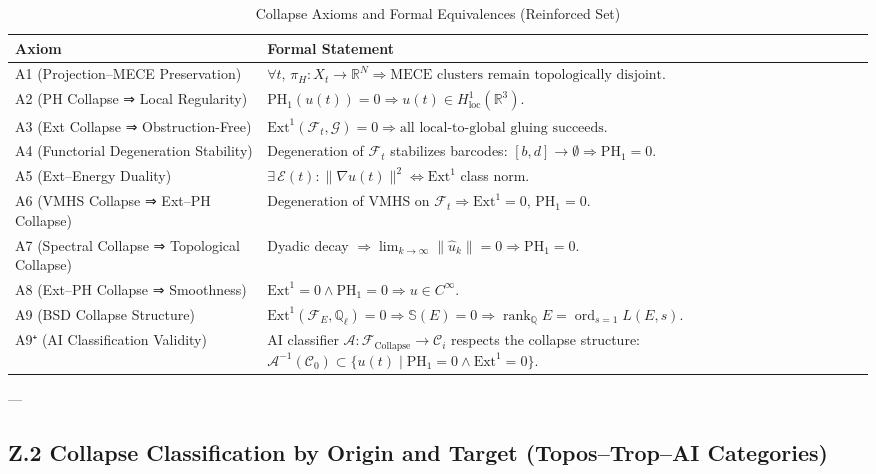\documentclass[11pt]{article}
\newcommand{\Sha}{\mathbb{S}}
\begin{document}
\begin{axiom}
\begin{axiom}
{{\begin{table}[H]
\centering
\renewcommand{\arraystretch}{1.4}
\begin{tabularx}{\textwidth}{lX}
\toprule
\textbf{Axiom} & \textbf{Formal Statement} \\
\midrule
A1 (Projection–MECE Preservation) & 
\( \forall t,\, \pi_H: X_t \to \mathbb{R}^N \Rightarrow \text{MECE clusters remain topologically disjoint}. \) \\
A2 (PH Collapse ⇒ Local Regularity) & 
\( \mathrm{PH}_1(u(t)) = 0 \Rightarrow u(t) \in H^1_{\text{loc}}(\mathbb{R}^3). \) \\
A3 (Ext Collapse ⇒ Obstruction-Free) & 
\( \mathrm{Ext}^1(\mathcal{F}_t, \mathcal{G}) = 0 \Rightarrow \text{all local-to-global gluing succeeds}. \) \\
A4 (Functorial Degeneration Stability) & 
Degeneration of \( \mathcal{F}_t \) stabilizes barcodes: \( [b,d] \to \emptyset \Rightarrow \mathrm{PH}_1 = 0. \) \\
A5 (Ext–Energy Duality) & 
\( \exists\, \mathcal{E}(t): \|\nabla u(t)\|^2 \Leftrightarrow \mathrm{Ext}^1 \) class norm. \\
A6 (VMHS Collapse ⇒ Ext–PH Collapse) & 
Degeneration of VMHS on \( \mathcal{F}_t \Rightarrow \mathrm{Ext}^1 = 0,\, \mathrm{PH}_1 = 0. \) \\
A7 (Spectral Collapse ⇒ Topological Collapse) & 
Dyadic decay \( \Rightarrow \lim_{k \to \infty} \|\hat{u}_k\| = 0 \Rightarrow \mathrm{PH}_1 = 0. \) \\
A8 (Ext–PH Collapse ⇒ Smoothness) & 
\( \mathrm{Ext}^1 = 0 \land \mathrm{PH}_1 = 0 \Rightarrow u \in C^\infty. \) \\
A9 (BSD Collapse Structure) & 
\( \mathrm{Ext}^1(\mathcal{F}_E, \mathbb{Q}_\ell) = 0 \Rightarrow \Sha(E) = 0 \Rightarrow 
\operatorname{rank}_{\mathbb{Q}} E = \operatorname{ord}_{s=1} L(E, s). \) \\
A9⁺ (AI Classification Validity) & 
AI classifier \( \mathcal{A}: \mathcal{F}_{\text{Collapse}} \to \mathcal{C}_i \) respects the collapse structure:  
\( \mathcal{A}^{-1}(\mathcal{C}_0) \subset \{ u(t) \mid \mathrm{PH}_1 = 0 \land \mathrm{Ext}^1 = 0 \} \). \\
\bottomrule
\end{tabularx}
\caption{Collapse Axioms and Formal Equivalences (Reinforced Set)}
\end{table}

---

\subsection*{Z.2 Collapse Classification by Origin and Target (Topos–Trop–AI Categories)}

}}
\end{axiom}
\end{axiom}
\end{document}
